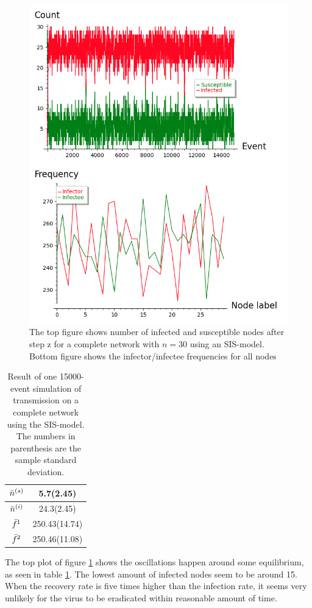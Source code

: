 \documentclass[12pt]{article} %
\numberwithin{equation}{section}
\begin{document}
\begin{figure}[ht]
    \centering
    \includegraphics[scale=0.7]{SIScomplete1.png}   
    \caption{The top figure shows number of infected and susceptible nodes after step z for a complete network with $n = 30$ using an SIS-model. Bottom figure shows the infector/infectee frequencies for all nodes}
    \label{completeSISplot1}
\end{figure}
\begin{table}[H]
    \centering
\begin{tabular}{c|c}
     $\Bar{n}^{(s)}$ &5.7(2.45) \\ \hline 
     $\Bar{n}^{(i)}$ &24.3(2.45)\\ \hline
     $\Bar{f}^1$ & 250.43(14.74) \\ \hline
     $\Bar{f}^2$ & 250.46(11.08) \\ 
\end{tabular}
    \caption{Result of one 15000-event simulation of transmission on a complete network using the SIS-model. The numbers in parenthesis are the sample standard deviation.}
    \label{table:siscomplete}
\end{table}
The top plot of figure \ref{completeSISplot1} shows the oscillations happen around some equilibrium, as seen in table \ref{table:siscomplete}. The lowest amount of infected nodes seem to be around 15. When the recovery rate is five times higher than the infection rate, it seems very unlikely for the virus to be eradicated within reasonable amount of time.
\end{document}
